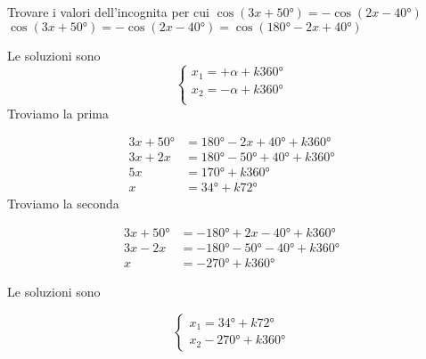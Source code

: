 \begin{exercise}
	Trovare i valori dell'incognita per cui $\cos(3x+\ang{50;;})=-\cos(2x-\ang{40;;})$
	\tcblower
$\cos(3x+\ang{50;;})=-\cos(2x-\ang{40;;})=\cos(\ang{180;;}-2x+\ang{40;;})$
	
	Le soluzioni sono 
	\[\begin{cases}
	x_1=+\alpha+k\ang{360;;}\\
	x_2=-\alpha+k\ang{360;;}\\
	\end{cases}\]
	Troviamo la prima
	
	\begin{align*}
	3x+\ang{50;;}&=\ang{180;;}-2x+\ang{40;;}+k\ang{360;;}\\
	3x+2x&=\ang{180;;}-\ang{50;;}+\ang{40;;}+k\ang{360;;}\\
	5x&=\ang{170;;}+k\ang{360;;}\\
	x&=\ang{34;;}+k\ang{72;;}
	\end{align*}
	Troviamo la seconda
	
	\begin{align*}
		3x+\ang{50;;}&=-\ang{180;;}+2x-\ang{40;;}+k\ang{360;;}\\
		3x-2x&=-\ang{180;;}-\ang{50;;}-\ang{40;;}+k\ang{360;;}\\
		x&=-\ang{270;;}+k\ang{360;;}
	\end{align*}
	
	Le soluzioni sono
	
	\[\begin{cases}
	x_1=\ang{34;;}+k\ang{72;;}\\
	x_2-\ang{270;;}+k\ang{360;;}
	\end{cases}\]
\end{exercise}

